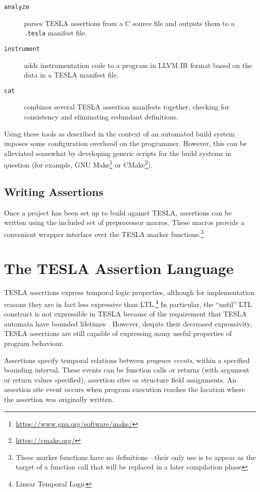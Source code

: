 \begin{description}
  \item[\texttt{analyze}] parses TESLA assertions from a C source file and
    outputs them to a \texttt{.tesla} manifest file.
  \item[\texttt{instrument}] adds instrumentation code to a program in LLVM IR
    format based on the data in a TESLA manifest file.
  \item[\texttt{cat}] combines several TESLA assertion manifests together,
    checking for consistency and eliminating redundant definitions.
\end{description}

Using these tools as described in the context of an automated build system
imposes some configuration overhead on the programmer. However, this can be
alleviated somewhat by developing generic scripts for the build systems in
question (for example, GNU
Make\footnote{\url{https://www.gnu.org/software/make/}} or
CMake\footnote{\url{https://cmake.org/}}).

\subsection{Writing Assertions}

Once a project has been set up to build against TESLA, assertions can be written
using the included set of preprocessor macros. These macros provide a convenient
wrapper interface over the TESLA marker functions.\footnote{These marker
functions have no definitions---their only use is to appear as the target of a
function call that will be replaced in a later compilation phase}

\section{The TESLA Assertion Language} \label{sec:assertions}

TESLA assertions express temporal logic properties, although for implementation
reasons they are in fact less expressive than LTL.\footnote{Linear Temporal
Logic} In particular, the ``until'' LTL construct \cite{pnueli_temporal_1977} is
not expressible in TESLA because of the requirement that TESLA automata have
bounded lifetimes \cite{anderson_tesla:_2014}. However, despite their decreased
expressivity, TESLA assertions are still capable of expressing many useful
properties of program behaviour.

Assertions specify temporal relations between \emph{program events}, within a
specified bounding interval. These events can be function calls or returns (with
argument or return values specified), assertion sites or structure field
assignments. An assertion site event occurs when program execution reaches the
location where the assertion was originally written.

